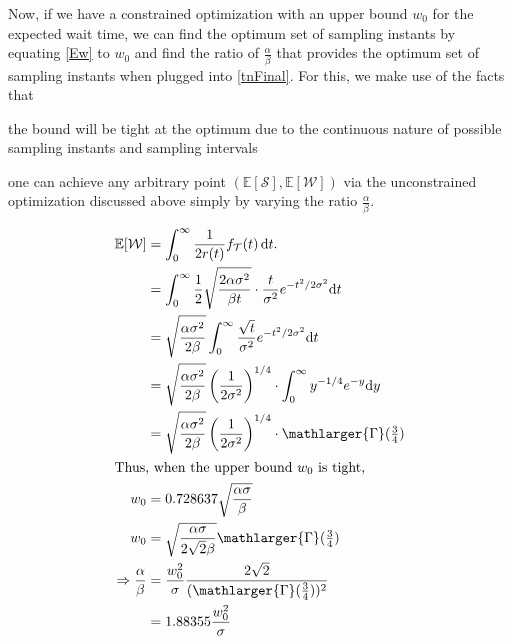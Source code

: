 Now, if we have a constrained optimization with an upper bound $w_0$ for the expected wait time, we can find the optimum set of sampling instants by equating \cref{Ew} to $w_0$ and find the ratio of $\frac{\alpha}{\beta}$ that provides the optimum set of sampling instants when plugged into \cref{tnFinal}.
For this, we make use of the facts that
\begin{enumerate*}[itemjoin={{, }}, itemjoin*={{, and }}]
    \item the bound will be tight at the optimum due to the continuous nature of possible sampling instants and sampling intervals
    \item one can achieve any arbitrary point $(\mathbb{E}[\mathcal{S}],\mathbb{E}[\mathcal{W}])$ via the unconstrained optimization discussed above simply by varying the ratio $\frac{\alpha}{\beta}$.
\end{enumerate*}
\begin{alignat*}{1}
\mathbb{E}[\mathcal{W}]&=\int_{0}^{\infty}\dfrac{1}{2r(t)}f_\mathcal{T}(t)\,\mathrm{d}t.\nonumber\\
&=\int_{0}^{\infty}\frac{1}{2}\sqrt{\frac{2\alpha\sigma^2}{\beta t}}\cdot \frac{t}{\sigma^2}e^{-{t^2}/{2\sigma^2}}\mathrm{d}t\\
&=\sqrt{\frac{\alpha\sigma^2}{2\beta}}\int_{0}^{\infty}\frac{\sqrt{t}}{\sigma^2}e^{-{t^2}/{2\sigma^2}}\mathrm{d}t\\
&=\sqrt{\frac{\alpha\sigma^2}{2\beta}}\left({\frac{1}{{2}\sigma^2}}\right)^{1/4}\cdot\int_{0}^{\infty}y^{-1/4}e^{-y}\mathrm{d}y\\
&=\sqrt{\frac{\alpha\sigma^2}{2\beta}}\left({\frac{1}{{2}\sigma^2}}\right)^{1/4}\cdot\mathlarger{\Gamma}(\tfrac{3}{4})\\
\intertext{Thus, when the upper bound $w_0$ is tight,}
w_0&=0.728637\sqrt{\frac{\alpha\sigma}{\beta}}\\
w_0&=\sqrt{\frac{\alpha\sigma}{2\sqrt{2}\beta}}\mathlarger{\Gamma}(\tfrac{3}{4})\\
\Rightarrow\frac{\alpha}{\beta}&=\frac{w_0^2}{\sigma}\frac{2\sqrt{2}}{(\mathlarger{\Gamma}(\tfrac{3}{4}))^2}\\&=1.88355\frac{w_0^2}{\sigma}
\end{alignat*}

